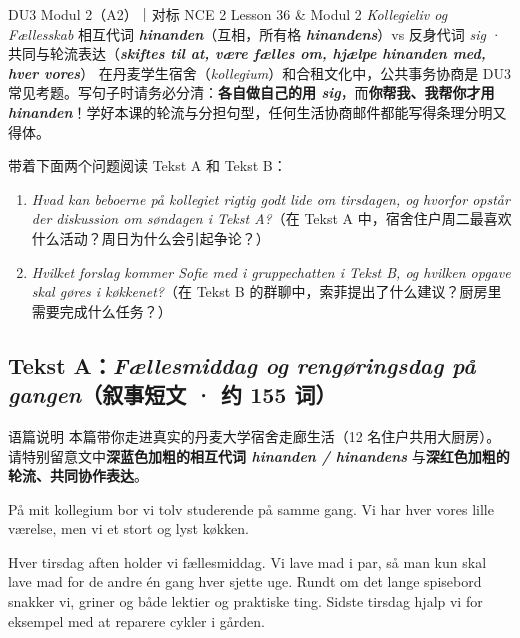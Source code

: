 {DU3 Modul 2（A2）｜对标 NCE 2 Lesson 36 \& Modul 2 \textit{Kollegieliv og Fællesskab}}
{相互代词 \textbf{\textit{hinanden}}（互相，所有格 \textbf{\textit{hinandens}}）vs 反身代词 \textit{sig} · 共同与轮流表达（\textbf{\textit{skiftes til at, være fælles om, hjælpe hinanden med, hver vores}}）}
{在丹麦学生宿舍（\textit{kollegium}）和合租文化中，公共事务协商是 DU3 常见考题。写句子时请务必分清：\textbf{各自做自己的用 \textit{sig}}，而\textbf{你帮我、我帮你才用 \textit{hinanden}}！学好本课的轮流与分担句型，任何生活协商邮件都能写得条理分明又得体。}

\begin{foerduleaeser}
带着下面两个问题阅读 Tekst A 和 Tekst B：
\begin{enumerate}
  \item \textit{Hvad kan beboerne på kollegiet rigtig godt lide om tirsdagen, og hvorfor opstår der diskussion om søndagen i Tekst A?}（在 Tekst A 中，宿舍住户周二最喜欢什么活动？周日为什么会引起争论？）
  \item \textit{Hvilket forslag kommer Sofie med i gruppechatten i Tekst B, og hvilken opgave skal gøres i køkkenet?}（在 Tekst B 的群聊中，索菲提出了什么建议？厨房里需要完成什么任务？）
\end{enumerate}
\end{foerduleaeser}


\subsection*{Tekst A：\textit{Fællesmiddag og rengøringsdag på gangen}（叙事短文 · 约 155 词）}

\begin{tipbox}{语篇说明}
本篇带你走进真实的丹麦大学宿舍走廊生活（12 名住户共用大厨房）。请特别留意文中\textbf{\color{NCDNavy}深蓝色加粗的相互代词 \textit{hinanden / hinandens}} 与\textbf{\color{NCDRed}深红色加粗的轮流、共同协作表达}。
\end{tipbox}

På mit kollegium bor vi tolv studerende på samme gang. Vi har hver vores lille værelse, men vi  et stort og lyst køkken.

Hver tirsdag aften holder vi fællesmiddag. Vi  lave mad i par, så man kun skal lave mad for de andre én gang hver sjette uge. Rundt om det lange spisebord snakker vi, griner og  både lektier og praktiske ting. Sidste tirsdag hjalp vi for eksempel med at reparere  cykler i gården.

